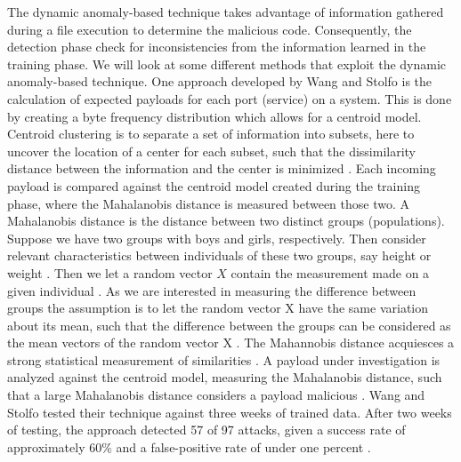 \documentclass[12pt]{article} %
\begin{document}
The dynamic anomaly-based technique takes advantage of information gathered during a file execution to determine the malicious code. Consequently, the detection phase check for inconsistencies from the information learned in the training phase. We will look at some different methods that exploit the dynamic anomaly-based technique. One approach developed by Wang and Stolfo \cite{idika2007survey} is the calculation of expected payloads for each port (service) on a system. This is done by creating a byte frequency distribution which allows for a centroid model. Centroid clustering is to separate a set of information into subsets, here to uncover the location of a center for each subset, such that the dissimilarity distance between the information and the center is minimized \cite{Heuristicmethods}. Each incoming payload is compared against the centroid model created during the training phase, where the Mahalanobis distance is measured between those two. A Mahalanobis distance is the distance between two distinct groups (populations). Suppose we have two groups with boys and girls, respectively. Then consider relevant characteristics between individuals of these two groups, say height or weight \cite{mclachlan1999mahalanobis}. Then we let a random vector $X$ contain the measurement made on a given individual \cite{mclachlan1999mahalanobis}. As we are interested in measuring the difference between groups the assumption is to let the random vector X have the same variation about its mean, such that the difference between the groups can be considered as the mean vectors of the random vector X \cite{mclachlan1999mahalanobis}. The Mahannobis distance acquiesces a strong statistical measurement of similarities \cite{idika2007survey}. A payload under investigation is analyzed against the centroid model, measuring the Mahalanobis distance, such that a large Mahalanobis distance considers a payload malicious \cite{idika2007survey}. Wang and Stolfo \cite{idika2007survey} tested their technique against three weeks of trained data. After two weeks of testing, the approach detected 57 of 97 attacks, given a success rate of approximately 60\% and a false-positive rate of under one percent \cite{idika2007survey}.
\end{document}
